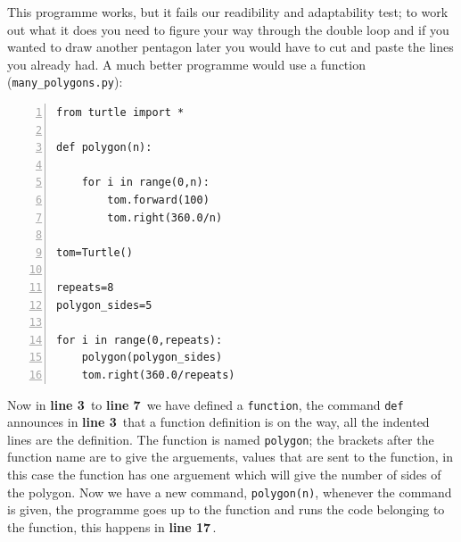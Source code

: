 \documentclass[11pt,a4paper]{scrartcl}
\newcommand{\lnn}[1]{\textbf{line #1}\,}
\begin{document}
This programme works, but it fails our readibility and adaptability
test; to work out what it does you need to figure your way through the
double loop and if you wanted to draw another pentagon later you would
have to cut and paste the lines you already had. A much better
programme would use a function (\texttt{many\_polygons.py}):
\begin{lstlisting}[numbers=left]
from turtle import *

def polygon(n):

    for i in range(0,n):
        tom.forward(100)
        tom.right(360.0/n)

tom=Turtle()

repeats=8
polygon_sides=5

for i in range(0,repeats):
    polygon(polygon_sides)
    tom.right(360.0/repeats)
\end{lstlisting}
Now in \lnn{3} to \lnn{7} we have defined a \texttt{function}, the
command \texttt{def} announces in \lnn{3} that a function definition
is on the way, all the indented lines are the definition. The function
is named \texttt{polygon}; the brackets after the function name are to
give the arguements, values that are sent to the function, in this
case the function has one arguement which will give the number of
sides of the polygon. Now we have a new command, \texttt{polygon(n)},
whenever the command is given, the programme goes up to the function
and runs the code belonging to the function, this happens in \lnn{17}.
\end{document}
